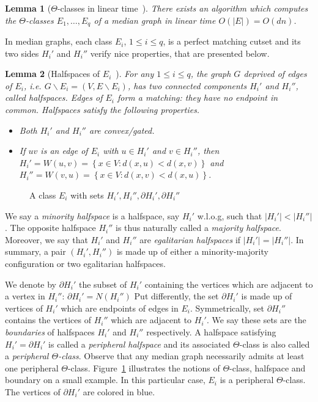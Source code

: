 \documentclass[11pt,letterpaper]{article}
\newtheorem{lemma}{Lemma}
\newcommand{\set}[1]{\left\{ #1 \right\}}
\newcommand{\card}[1]{\left| #1 \right|}
\begin{document}
\begin{lemma}[$\Theta$-classes in linear time~\cite{BeChChVa20}]
There exists an algorithm which computes the $\Theta$-classes $E_1,\ldots,E_q$ of a median graph in linear time $O(\card{E}) = O(dn)$.
\label{le:linear_classes}
\end{lemma}

In median graphs, each class $E_i$, $1\le i\le q$, is a perfect matching cutset and its two sides $H_i'$ and $H_i''$ verify nice properties, that are presented below.

\begin{lemma}[Halfspaces of $E_i$~\cite{BeChChVa20,HaImKl99,Mu80}]
For any $1\le i\le q$, the graph $G$ deprived of edges of $E_i$, {\em i.e.} $G\backslash E_i = (V,E\backslash E_i)$, has two connected components $H_i'$ and $H_i''$, called \textit{halfspaces}. Edges of $E_i$ form a matching: they have no endpoint in common. Halfspaces satisfy the following properties.
\begin{itemize}
\item Both $H_i'$ and $H_i''$ are convex/gated.
\item If $uv$ is an edge of $E_i$ with $u \in H_i'$ and $v \in H_i''$, then $H_i' = W(u,v) = \set{x \in V: d(x,u) < d(x,v)}$ and $H_i'' = W(v,u) = \set{x \in V: d(x,v) < d(x,u)}$.
\end{itemize}
\label{le:halfspaces}
\end{lemma}

\begin{figure}[h]
\centering
\scalebox{0.85}{}
\caption{A class $E_i$ with sets $H_i', H_i'', \partial H_i', \partial H_i''$}
\label{fig:halfspaces}
\end{figure}

We say a \textit{minority halfspace} is a halfspace, say $H_i'$ w.l.o.g, such that $\vert H_i' \vert < \vert H_i'' \vert$. The opposite halfspace $H_i''$ is thus naturally called a \textit{majority halfspace}. Moreover, we say that $H_i'$ and $H_i''$ are \textit{egalitarian halfspaces} if $\vert H_i' \vert = \vert H_i'' \vert$. In summary, a pair $(H_i',H_i'')$ is made up of either a minority-majority configuration or two egalitarian halfspaces.

We denote by $\partial H_i'$ the subset of $H_i'$ containing the vertices which are adjacent to a vertex in $H_i''$: $\partial H_i' = N(H_i'')$ Put differently, the set $\partial H_i'$ is made up of vertices of $H_i'$ which are endpoints of edges in $E_i$. Symmetrically, set $\partial H_i''$ contains the vertices of $H_i''$ which are adjacent to $H_i'$. We say these sets are the \textit{boundaries} of halfspaces $H_i'$ and $H_i''$ respectively. A halfspace satisfying $H_i' = \partial H_i'$ is called a \textit{peripheral halfspace} and its associated $\Theta$-class is also called a \textit{peripheral $\Theta$-class}. Observe that any median graph necessarily admits at least one peripheral $\Theta$-class. Figure~\ref{fig:halfspaces} illustrates the notions of $\Theta$-class, halfspace and boundary on a small example. In this particular case, $E_i$ is a peripheral $\Theta$-class. The vertices of $\partial H_i'$ are colored in blue.
\end{document}
